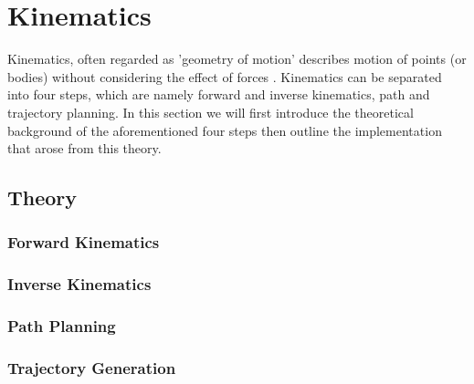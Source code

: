 \section{Kinematics}
Kinematics, often regarded as 'geometry of motion' describes motion of points (or bodies) without considering the effect of forces \cite{wikikine}. Kinematics can be separated into four steps, which are namely forward and inverse kinematics, path and trajectory planning. In this section we will first introduce the theoretical background of the aforementioned four steps then outline the implementation that arose from this theory.
\subsection{Theory}


\subsubsection{Forward Kinematics}

\subsubsection{Inverse Kinematics}

\subsubsection{Path Planning}

\subsubsection{Trajectory Generation}



